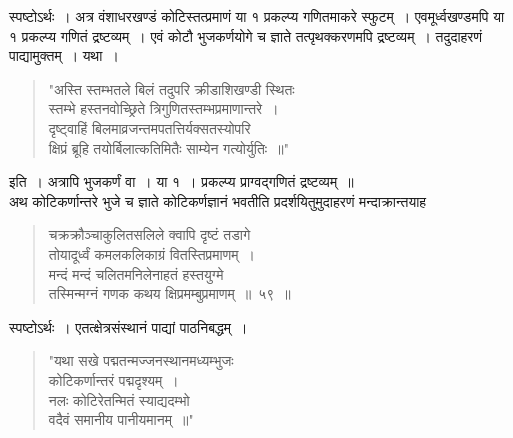 \documentclass[11pt, openany]{book}
\begin{document}
स्पष्टोऽर्थः~। अत्र वंशाधरखण्डं कोटिस्तत्प्रमाणं या १ प्रकल्प्य गणितमाकरे
स्फुटम्~। एवमूर्ध्वखण्डमपि या १ प्रकल्प्य गणितं द्रष्टव्यम्~। एवं कोटौ 
भुजकर्णयोगे च ज्ञाते तत्पृथक्करणमपि द्रष्टव्यम्~। तदुदाहरणं पाद्यामुक्तम्~। यथा~।
 \newpage%
\begin{quote}
    \q
     "अस्ति स्तम्भतले बिलं तदुपरि क्रीडाशिखण्डी स्थितः \\

\vspace{-7mm}
\hspace{1mm} स्तम्भे हस्तनवोच्छ्रिते त्रिगुणितस्तम्भप्रमाणान्तरे~। \\

\vspace{-7mm}
\hspace{1mm} दृष्ट्वाहिं बिलमाव्रजन्तमपतत्तिर्यक्सतस्योपरि \\

\vspace{-7mm}
\hspace{1mm} क्षिप्रं ब्रूहि तयोर्बिलात्कतिमितैः साम्येन गत्योर्युतिः~॥"
\end{quote}

 इति~। अत्रापि भुजकर्णं वा~। या १~। प्रकल्प्य प्राग्वद्गणितं द्रष्टव्यम्~॥\\

\vspace{-3mm}
 अथ कोटिकर्णान्तरे भुजे च ज्ञाते कोटिकर्णज्ञानं भवतीति 
प्रदर्शयितुमुदाहरणं मन्दाक्रान्तयाह\textendash 
\begin{quote}
    \ex
    चक्रक्रौञ्चाकुलितसलिले क्वापि दृष्टं तडागे \\
 तोयादूर्ध्वं कमलकलिकाग्रं वितस्तिप्रमाणम्~। \\
 मन्दं मन्दं चलितमनिलेनाहतं हस्तयुग्मे \\
 तस्मिन्मग्नं गणक कथय क्षिप्रमम्बुप्रमाणम्~॥~५९~॥~
\end{quote}
 
स्पष्टोऽर्थः~। एतत्क्षेत्रसंस्थानं पाद्यां पाठनिबद्धम्~। 
\begin{quote}
    \q
     "यथा सखे पद्मतन्मज्जनस्थानमध्यम्भुजः \\

\vspace{-7mm}
\hspace{1mm} कोटिकर्णान्तरं पद्मदृश्यम्~। \\

\vspace{-7mm}
\hspace{1mm} नलः कोटिरेतन्मितं स्याद्यदम्भो \\

\vspace{-7mm}
\hspace{1mm} वदैवं समानीय पानीयमानम्~॥"
\end{quote}
\end{document}
